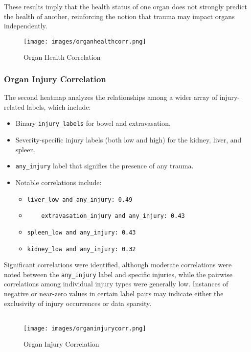 \documentclass[a4paper,12pt]{article}
\begin{document}
These results imply that the health status of one organ does not strongly predict the health of another, reinforcing the notion that trauma may impact organs independently.


\begin{figure}[!htbp]
    \centering
    \texttt{[image: images/organhealthcorr.png]}
    \caption{Organ Health Correlation}
    \label{fig:health_corr}
\end{figure}

\subsubsection{Organ Injury Correlation}

The second heatmap analyzes the relationships among a wider array of injury-related labels, which include:
\begin{itemize}



    \item Binary \verb|injury_labels| for bowel and extravasation,
    \item Severity-specific injury labels (both low and high) for the kidney, liver, and spleen,
    \item \verb|any_injury| label that signifies the presence of any trauma.
    \item Notable correlations include:
    \begin{itemize}
        \item \verb|liver_low and any_injury: 0.49|
        \item \verb|	extravasation_injury and any_injury: 0.43|
        \item \verb|spleen_low and any_injury: 0.43|
        \item \verb|kidney_low and any_injury: 0.32|
    \end{itemize}
       
\end{itemize}

Significant correlations were identified, although moderate correlations were noted between the \verb|any_injury| label and specific injuries, while the pairwise correlations among individual injury types were generally low. Instances of negative or near-zero values in certain label pairs may indicate either the exclusivity of injury occurrences or data sparsity.
\\
\\
\begin{figure}[!htbp]
    \centering
    \texttt{[image: images/organinjurycorr.png]}
    \caption{Organ Injury Correlation}
    \label{fig:injury_corr}
\end{figure}
 
\end{document}
